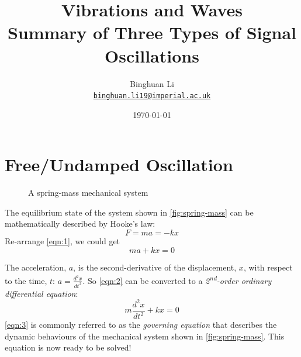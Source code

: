 \documentclass[12pt,a4paper]{article}
\begin{document}
\title{\textbf{Vibrations and Waves} \\ Summary of Three Types of Signal Oscillations}
\author{Binghuan Li\\ \href{mailto:binghuan.li19@imperial.ac.uk}{\texttt{binghuan.li19@imperial.ac.uk}}}
\date{\today}
\maketitle
\section{Free/Undamped Oscillation}

\begin{figure}[H]
    \centering

    \caption{A spring-mass mechanical system}
    \label{fig:spring-mass}
\end{figure}

The equilibrium state of the system shown in \autoref{fig:spring-mass} can be mathematically described by Hooke's law:
\begin{equation} \label{eqn:1}
    F = ma = -kx
\end{equation}
Re-arrange \autoref{eqn:1}, we could get
\begin{equation} \label{eqn:2}
    ma + kx = 0
\end{equation}

The acceleration, $a$, is the second-derivative of the displacement, $x$, with respect to the time, $t$: $\displaystyle a=\frac{d^{2}x}{dt^{2}}$. So \autoref{eqn:2}  can be converted to a \textit{2\textsuperscript{nd}-order ordinary differential equation}:
\begin{equation} \label{eqn:3}
    m\frac{d^{2}x}{dt^{2}}+kx=0
\end{equation}
\autoref{eqn:3} is commonly referred to as the \textit{governing equation} that describes the dynamic behaviours of the mechanical system shown in \autoref{fig:spring-mass}. This equation is now ready to be solved!
\end{document}
